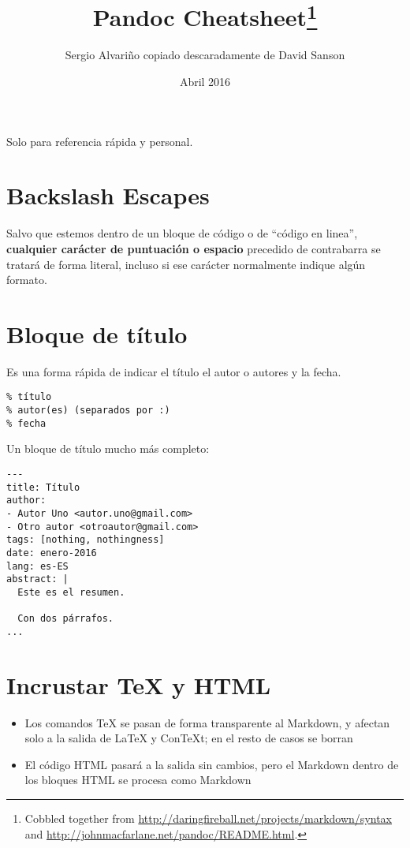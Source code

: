 \documentclass[12pt,spanish,]{article}
\title{Pandoc Cheatsheet\footnote{Cobbled together from
  \url{http://daringfireball.net/projects/markdown/syntax} and
  \url{http://johnmacfarlane.net/pandoc/README.html}.}}
\author{Sergio Alvariño copiado descaradamente de David Sanson}
\date{Abril 2016}
\providecommand{\tightlist}{%
  \setlength{\itemsep}{0pt}\setlength{\parskip}{0pt}}
\begin{document}
\maketitle

{
\setcounter{tocdepth}{3}
\tableofcontents
}
Solo para referencia rápida y personal.

\section{Backslash Escapes}\label{backslash-escapes}

Salvo que estemos dentro de un bloque de código o de ``código en
linea'', \textbf{cualquier carácter de puntuación o espacio} precedido
de contrabarra se tratará de forma literal, incluso si ese carácter
normalmente indique algún formato.

\section{Bloque de título}\label{bloque-de-tuxedtulo}

Es una forma rápida de indicar el título el autor o autores y la fecha.

\begin{verbatim}
% título
% autor(es) (separados por :)
% fecha
\end{verbatim}

Un bloque de título mucho más completo:

\begin{verbatim}
---
title: Título
author:
- Autor Uno <autor.uno@gmail.com>
- Otro autor <otroautor@gmail.com>
tags: [nothing, nothingness]
date: enero-2016
lang: es-ES
abstract: |
  Este es el resumen.

  Con dos párrafos.
...
\end{verbatim}

\section{Incrustar TeX y HTML}\label{incrustar-tex-y-html}

\begin{itemize}
\tightlist
\item
  Los comandos TeX se pasan de forma transparente al Markdown, y afectan
  solo a la salida de LaTeX y ConTeXt; en el resto de casos se borran
\item
  El código HTML pasará a la salida sin cambios, pero el Markdown dentro
  de los bloques HTML se procesa como Markdown
\end{itemize}
\end{document}
